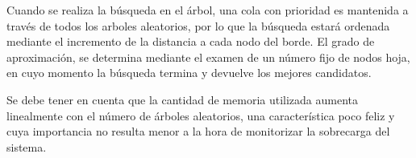 \documentclass[a4paper,11pt,spanish]{article}
\begin{document}
Cuando se realiza la b\'usqueda en el árbol, una cola con prioridad es mantenida a través de todos los arboles aleatorios, por lo que la búsqueda estará ordenada mediante el incremento de la distancia a cada nodo del borde. 
El grado de aproximación, se determina mediante el examen de un número fijo de nodos hoja, en cuyo momento la búsqueda termina y devuelve los mejores candidatos.


Se debe tener en cuenta que la cantidad de memoria utilizada aumenta linealmente con el número de árboles aleatorios, una característica poco feliz y cuya importancia no resulta menor a la hora de monitorizar la sobrecarga del sistema.



 
\end{document}

